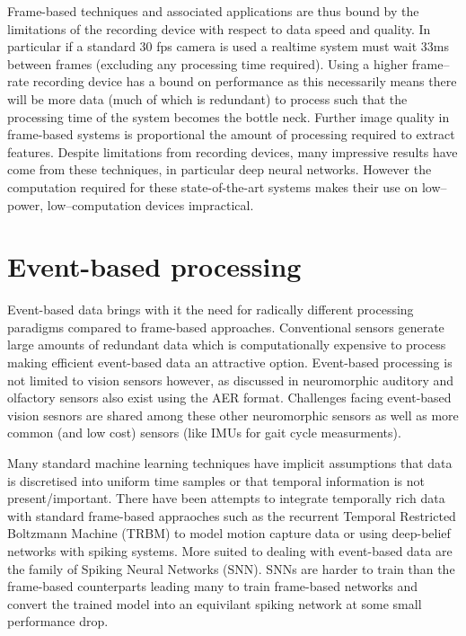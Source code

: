 Frame-based techniques and associated applications are thus bound by the limitations of the recording device with respect to data speed and quality. 
In particular if a standard 30 fps camera is used a realtime system must wait 33ms between frames (excluding any processing time required). 
Using a higher frame--rate recording device has a bound on performance as this necessarily means there will be more data (much of which is redundant) to process such that the processing time of the system becomes the bottle neck. 
Further image quality in frame-based systems is proportional the amount of processing required to extract features.
Despite limitations from recording devices, many impressive results have come from these techniques, in particular deep neural networks\cite{krizhevsky2012imagenet}.
However the computation required for these state-of-the-art systems makes their use on low--power, low--computation devices impractical. 



\pagebreak
\section{Event-based processing}     %
Event-based data brings with it the need for radically different processing paradigms compared to frame-based approaches\cite{perez2013mapping, martin2015spiking, tan2015benchmarking}.
Conventional sensors generate large amounts of redundant data which is computationally expensive to process making efficient event-based data an attractive option\cite{vanarse2016review}. 
Event-based processing is not limited to vision sensors however, as discussed in \cite{vanarse2016review} neuromorphic auditory and olfactory sensors also exist using the AER format. 
Challenges facing event-based vision sesnors are shared among these other neuromorphic sensors as well as more common (and low cost) sensors (like IMUs for gait cycle measurments\cite{fida2015pre}).

Many standard machine learning techniques have implicit assumptions that data is discretised into uniform time samples or that temporal information is not present/important.
There have been attempts to integrate temporally rich data with standard frame-based appraoches such as the recurrent Temporal Restricted Boltzmann Machine (TRBM)\cite{sutskever2009recurrent} to model motion capture data or using deep-belief networks with spiking systems\cite{Neftci2014, pedroni2013neuromorphic, OConnor2013}.
More suited to dealing with event-based data are the family of Spiking Neural Networks (SNN)\cite{henderson2015spike, perez2013mapping}.
SNNs are harder to train than the frame-based counterparts leading many to train frame-based networks and convert the trained model into an equivilant spiking network at some small performance drop\cite{perez2013mapping, pedroni2013neuromorphic, OConnor2013}.

